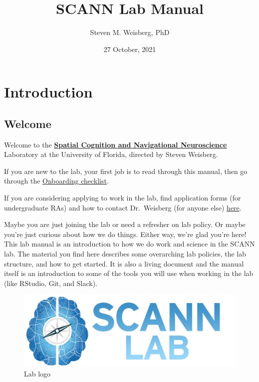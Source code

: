 \documentclass[
  12pt,
]{book}
\title{SCANN Lab Manual}
\author{Steven M. Weisberg, PhD}
\date{27 October, 2021}
\begin{document}
\maketitle

{
\hypersetup{linkcolor=}
\setcounter{tocdepth}{1}
\tableofcontents
}
\hypertarget{part-introduction}{%
\part*{Introduction}\label{part-introduction}}

\hypertarget{welcome}{%
\chapter{Welcome}\label{welcome}}

Welcome to the \href{https://scannlab.psych.ufl.edu}{\textbf{Spatial Cognition and Navigational Neuroscience}} Laboratory at the University of Florida, directed by Steven Weisberg.

If you are new to the lab, your first job is to read through this manual, then go through the \href{onboarding}{Onboarding checklist}.

If you are considering applying to work in the lab, find application forms (for undergraduate RAs) and how to contact Dr.~Weisberg (for anyone else) \href{https://scannlab.psych.ufl.edu/join-us}{here}.

Maybe you are just joining the lab or need a refresher on lab policy. Or maybe you're just curious about how we do things. Either way, we're glad you're here! This lab manual is an introduction to how we do work and science in the SCANN lab. The material you find here describes some overarching lab policies, the lab structure, and how to get started. It is also a living document and the manual itself is an introduction to some of the tools you will use when working in the lab (like RStudio, Git, and Slack).

\begin{figure}
\centering
\includegraphics{figs/SCANN_Lab_Logo_NoOutline_With_Text.png}
\caption{Lab logo}
\end{figure}
\end{document}
